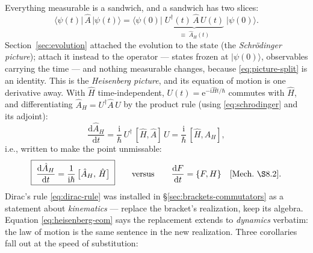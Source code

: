 \documentclass[11pt]{article}
\theoremstyle{plain}
\theoremstyle{definition}
\theoremstyle{remark}
\newcommand{\dd}{\mathrm{d}}
\newcommand{\ee}{\mathrm{e}}
\newcommand{\ii}{\mathrm{i}}
\newcommand{\tot}[2]{\frac{\dd #1}{\dd #2}}
\newcommand{\op}[1]{\hat{#1}}
\newcommand{\ket}[1]{\lvert #1 \rangle}
\newcommand{\bra}[1]{\langle #1 \rvert}
\begin{document}
Everything measurable is a sandwich, and a sandwich has two slices:
\begin{equation}
  \bra{\psi(t)}\,\op A\,\ket{\psi(t)}
  = \bra{\psi(0)}\;
    \underbrace{U^\dagger(t)\,\op A\,U(t)}_{\displaystyle
    \equiv\; \op A_H(t)}
    \;\ket{\psi(0)} .
  \label{eq:picture-split}
\end{equation}
Section~\ref{sec:evolution} attached the evolution to the state (the
\emph{Schr\"odinger picture}); attach it instead to the operator ---
states frozen at $\ket{\psi(0)}$, observables carrying the time ---
and nothing measurable changes, because \eqref{eq:picture-split} is
an identity. This is the \emph{Heisenberg picture}, and its equation
of motion is one derivative away. With $\op H$ time-independent,
$U(t) = \ee^{-\ii\op H t/\hbar}$ commutes with $\op H$, and
differentiating $\op A_H = U^\dagger \op A\, U$ by the product rule
(using \eqref{eq:schrodinger} and its adjoint):
\begin{equation}
  \tot{\op A_H}{t}
  = \frac{\ii}{\hbar}\,U^\dagger\,[\op H, \op A]\,U
  = \frac{\ii}{\hbar}\,[\op H, \op A_H],
\end{equation}
i.e., written to make the point unmissable:
\begin{equation}
  \boxed{\;
  \tot{\op A_H}{t}
  = \frac{1}{\ii\hbar}\,\bigl[\op A_H,\, \op H\bigr]
  \;}
  \qquad\text{versus}\qquad
  \tot Ft = \{F, H\}
  \quad\text{[Mech.\ \S8.2]}.
  \label{eq:heisenberg-eom}
\end{equation}
Dirac's rule \eqref{eq:dirac-rule} was installed in
\S\ref{sec:brackets-commutators} as a statement about
\emph{kinematics} --- replace the bracket's realization, keep its
algebra. Equation \eqref{eq:heisenberg-eom} says the replacement
extends to \emph{dynamics} verbatim: the law of motion is the same
sentence in the new realization. Three corollaries fall out at the
speed of substitution:
\end{document}
